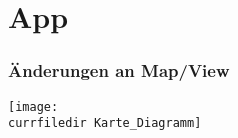 \section{App}

\begin{frame}\frametitle{Änderungen an Map/View}
    \begin{center}
    \texttt{[image: \\currfiledir Karte\_Diagramm]}
    \end{center}
\end{frame}